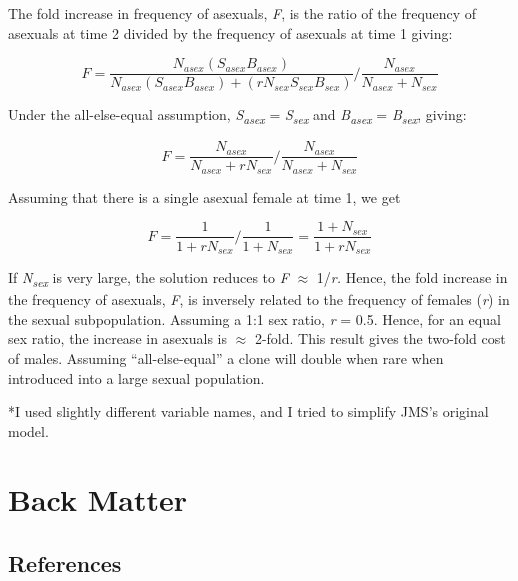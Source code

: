 \documentclass[
  11pt,
  letterpaper,
]{scrbook}
\newlength{\cslhangindent}
\newlength{\cslentryspacingunit} %
\newenvironment{CSLReferences}[2] %
 {%
  \setlength{\parindent}{0pt}
  \ifodd #1
  \let\oldpar\par
  \def\par{\hangindent=\cslhangindent\oldpar}
  \fi
  \setlength{\parskip}{#2\cslentryspacingunit}
 }%
 {}
\begin{document}
\begin{tcolorbox}
The fold increase in frequency of asexuals, \emph{F}, is the ratio of
the frequency of asexuals at time 2 divided by the frequency of asexuals
at time 1 giving:

\[F = \frac{N_{asex}(S_{asex}B_{asex})}{N_{asex}({S}_{asex}B_{asex}) + ({rN}_{sex}S_{sex}B_{sex})}/\frac{N_{asex}}{N_{asex} + N_{sex}}\]

Under the all-else-equal assumption, \emph{S\textsubscript{asex}} =
\emph{S\textsubscript{sex}} and \emph{B\textsubscript{asex}} =
\emph{B\textsubscript{sex}}, giving:

\[F = \frac{N_{asex}}{N_{asex} + {rN}_{sex}}/\frac{N_{asex}}{N_{asex} + N_{sex}}\]

Assuming that there is a single asexual female at time 1, we get

\[F = \frac{1}{1 + {rN}_{sex}}/\frac{1}{1 + N_{sex}} = \frac{1 + N_{sex}}{1 + {rN}_{sex}}\]

If \emph{N\textsubscript{sex}} is very large, the solution reduces to
\emph{F} \(\approx\) 1/\emph{r.} Hence, the fold increase in the
frequency of asexuals, \emph{F}, is inversely related to the frequency
of females (\emph{r}) in the sexual subpopulation. Assuming a 1:1 sex
ratio, \emph{r} = 0.5. Hence, for an equal sex ratio, the increase in
asexuals is \(\approx\) 2-fold. This result gives the two-fold cost of
males. Assuming ``all-else-equal'' a clone will double when rare when
introduced into a large sexual population.

*I used slightly different variable names, and I tried to simplify JMS's
original model.

\end{tcolorbox}

\part{Back Matter}

\hypertarget{references}{%
\chapter*{References}\label{references}}


\hypertarget{refs}{}
\begin{CSLReferences}{0}{0}
\end{CSLReferences}


\backmatter
\end{document}
